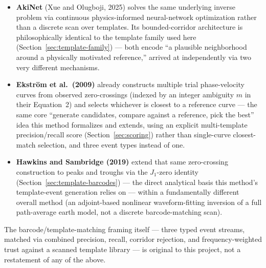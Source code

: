\documentclass[11pt]{article}
\begin{document}
\begin{itemize}
{    signals are exposed to the caller} --- the public return is binary (a curve, or an exception),
    and this project's \texttt{python/dispcurve\_pick/} package vendors and lightly instruments
    exactly this file to surface those already-computed internals (bad-quality-crossing fraction,
    accepted-pick count, frequency-coverage fraction, mean pick amplitude ratio) as an explicit,
    continuous quality score, without altering the picking algorithm's own behavior. AkiNet's own
    paper (Xue and Olugboji, 2025) identifies ``cycle skip'' --- committing early to the wrong
    phase oscillation --- as this class of method's characteristic failure mode; seislib's own
    cycle-jump rejection and backup-picks mechanism (stage~3) is its internal defense against
    exactly that failure mode, not an omission this project needed to work around.
  \item \textbf{AkiNet} (Xue and Olugboji, 2025) solves the same underlying inverse problem via
    continuous physics-informed neural-network optimization rather than a discrete scan over
    templates. Its bounded-corridor architecture is philosophically identical to the template
    family used here (Section~\ref{sec:template-family}) --- both encode ``a plausible
    neighborhood around a physically motivated reference,'' arrived at independently via two very
    different mechanisms.
  \item \textbf{Ekstr\"om et al.\ (2009)} already constructs multiple trial phase-velocity curves
    from observed zero-crossings (indexed by an integer ambiguity $m$ in their Equation~2) and
    selects whichever is closest to a reference curve --- the same core ``generate candidates,
    compare against a reference, pick the best'' idea this method formalizes and extends, using
    an explicit multi-template precision/recall score (Section~\ref{sec:scoring}) rather than
    single-curve closest-match selection, and three event types instead of one.
  \item \textbf{Hawkins and Sambridge (2019)} extend that same zero-crossing construction to
    peaks and troughs via the $J_1$-zero identity (Section~\ref{sec:template-barcodes}) --- the
    direct analytical basis this method's template-event generation relies on --- within a
    fundamentally different overall method (an adjoint-based nonlinear waveform-fitting
    inversion of a full path-average earth model, not a discrete barcode-matching scan).
\end{itemize}

The barcode/template-matching framing itself --- three typed event streams, matched via combined
precision, recall, corridor rejection, and frequency-weighted trust against a scanned template
library --- is original to this project, not a restatement of any of the above.
\end{document}
